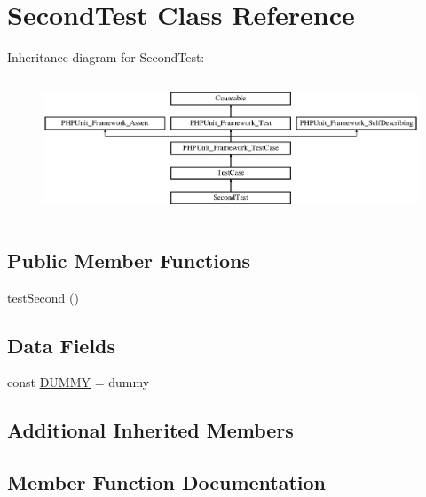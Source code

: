 \hypertarget{class_foo_1_1_data_provider_issue2833_1_1_second_test}{}\section{Second\+Test Class Reference}
\label{class_foo_1_1_data_provider_issue2833_1_1_second_test}
Inheritance diagram for Second\+Test\+:\begin{figure}[H]
\begin{center}
\leavevmode
\includegraphics[height=4.129793cm]{class_foo_1_1_data_provider_issue2833_1_1_second_test}
\end{center}
\end{figure}
\subsection*{Public Member Functions}
\begin{DoxyCompactItemize}
\item 
\mbox{\hyperlink{class_foo_1_1_data_provider_issue2833_1_1_second_test_a2446a8b0d0707750a27e316538ba9677}{test\+Second}} ()
\end{DoxyCompactItemize}
\subsection*{Data Fields}
\begin{DoxyCompactItemize}
\item 
const \mbox{\hyperlink{class_foo_1_1_data_provider_issue2833_1_1_second_test_a9eee302e4045c79e9b8ccc51a73851c6}{D\+U\+M\+MY}} = \textquotesingle{}dummy\textquotesingle{}
\end{DoxyCompactItemize}
\subsection*{Additional Inherited Members}


\subsection{Member Function Documentation}
\mbox{\label{class_foo_1_1_data_provider_issue2833_1_1_second_test_a2446a8b0d0707750a27e316538ba9677}} 
